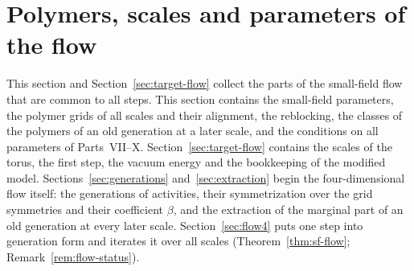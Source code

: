 \section{Polymers, scales and parameters of the flow}\label{sec:flow}

This section and Section~\ref{sec:target-flow} collect the parts of the small-field flow that are common to all steps. This section contains the small-field parameters, the polymer grids of all scales and their alignment, the reblocking, the classes of the polymers of an old generation at a later scale, and the conditions on all parameters of Parts~VII--X. Section~\ref{sec:target-flow} contains the scales of the torus, the first step, the vacuum energy and the bookkeeping of the modified model. Sections~\ref{sec:generations} and~\ref{sec:extraction} begin the four-dimensional flow itself: the generations of activities, their symmetrization over the grid symmetries and their coefficient $\beta$, and the extraction of the marginal part of an old generation at every later scale. Section~\ref{sec:flow4} puts one step into generation form and iterates it over all scales (Theorem~\ref{thm:sf-flow}; Remark~\ref{rem:flow-status}).

